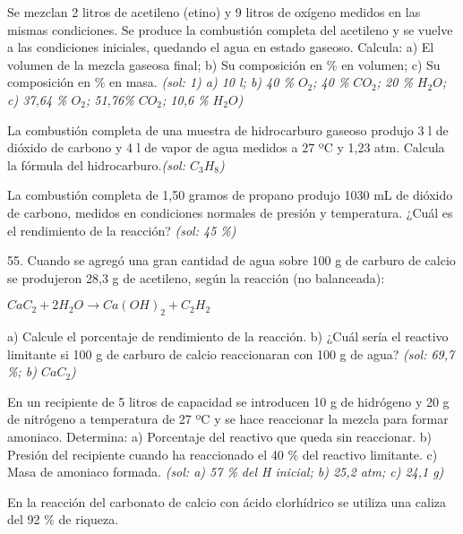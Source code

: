 \begin{multicols}{2}
\begin{problem}
\end{problem}
\begin{problem}
Se mezclan 2 litros de acetileno (etino) y 9 litros de oxígeno medidos en las mismas condiciones. Se produce la combustión completa del acetileno y se vuelve a las condiciones iniciales, quedando el agua en estado gaseoso. Calcula: a) El volumen de la mezcla gaseosa final; b) Su composición en \% en volumen; c) Su composición en \% en masa. \textit{\scriptsize(sol: 1)	a) 10 l; b) 40 \% $O_2$; 40 \% $CO_2$; 20 \% $H_2O$; c) 37,64 \% $O_2$; 51,76\% $CO_2$; 10,6 \% $H_2O$)}
\end{problem}
\begin{problem}
La combustión completa de una muestra de hidrocarburo gaseoso produjo 3 l de dióxido de carbono y 4 l de vapor de agua medidos a 27 ºC y 1,23 atm. Calcula la fórmula del hidrocarburo.\textit{\scriptsize(sol: $C_3H_8$)} 
\end{problem}
\begin{problem}
La combustión completa de 1,50 gramos de propano produjo 1030 mL de dióxido de carbono, medidos en condiciones normales de presión y temperatura. ¿Cuál es el rendimiento de la reacción? \textit{\scriptsize(sol: 45 \%)} 
\end{problem}
\begin{problem}
55.	Cuando se agregó una gran cantidad de agua sobre 100 g de carburo de calcio se produjeron 28,3 g de acetileno, según la reacción (no balanceada):
\begin{center}
$CaC_2 + 2H_2O \longrightarrow Ca(OH)_2 + C_2H_2$
\end{center}
a)	Calcule el porcentaje de rendimiento de la reacción.
b)	¿Cuál sería el reactivo limitante si 100 g de carburo de calcio reaccionaran con 100 g de agua? \textit{\scriptsize(sol: 69,7 \%; b) $CaC_2$)} 
\end{problem}
\begin{problem}
En un recipiente de 5 litros de capacidad se introducen 10 g de hidrógeno y 20 g de nitrógeno a temperatura de 27 ºC y se hace reaccionar la mezcla para formar amoniaco. Determina:
a)	Porcentaje del reactivo que queda sin reaccionar.
b)	Presión del recipiente cuando ha reaccionado el 40 \% del reactivo limitante.
c)	Masa de amoniaco formada. \textit{\scriptsize(sol: a) 57 \% del H inicial; b) 25,2 atm; c) 24,1 g)} 	
\end{problem}
\begin{problem}
En la reacción del carbonato de calcio con ácido clorhídrico se utiliza una caliza del 92 \% de riqueza.

\end{problem}
\end{multicols}
